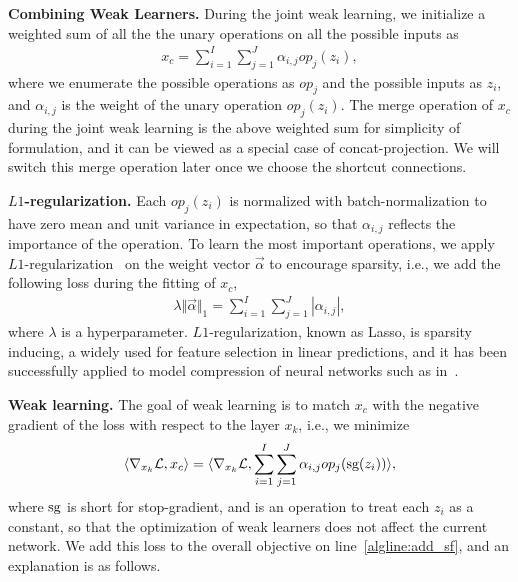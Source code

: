 \textbf{Combining Weak Learners.} During the joint weak learning, we initialize a weighted sum of all the the unary operations on all the possible inputs as
\begin{align}
    x_c = \sum _{i=1}^I \sum_{j=1}^J \alpha_{i,j} op_j(z_i),
    \label{eq:x_c_select}
\end{align}
where we enumerate the possible operations as $op_j$ and the possible inputs as $z_i$, and $\alpha_{i,j}$ is the weight of the unary operation $op_j(z_i)$.  
The merge operation of $x_c$ during the joint weak learning is the above weighted sum for simplicity of formulation, and it can be viewed as a special case
of concat-projection. We will switch this merge operation later once we choose the shortcut connections. 


\textbf{$L1$-regularization.} Each $op_j(z_i)$ is normalized with batch-normalization to have zero mean and unit variance in expectation, so that $\alpha_{i,j}$ reflects 
the importance of the operation.
To learn the most important operations, we apply $L1$-regularization~\citep{lasso} on the weight vector $\vec{\alpha}$ to encourage sparsity, i.e.,
we add the following loss during the fitting of $x_c$,  
\begin{align}
    \lambda \Vert \vec{\alpha} \Vert_1 = \sum_{i=1}^I \sum _{j=1}^J | \alpha _{i,j} |,
    \label{eq:x_c_select_loss}
\end{align} 
where $\lambda$ is a hyperparameter. $L1$-regularization, known as Lasso, is sparsity inducing, a widely used for feature selection in 
linear predictions, and it has been successfully applied to model compression of neural networks such as in~\citep{huang2017condensenet}.


\textbf{Weak learning.} 
The goal of weak learning is to match $x_c$ with the negative gradient of the loss with respect to the layer $x_{k}$, i.e., 
we minimize 
\begin{align}
   \langle \nabla_{x_{k}} \mathcal{L}, x_c \rangle =  
   \langle \nabla_{x_{k}} \mathcal{L}, \sum _{i=1}^I \sum_{j=1}^J \alpha_{i,j} op_j( \textrm{sg}( z_i ) ) \rangle,
    \label{eq:x_c_linear_loss}
\end{align}
where $\textrm{sg}$ is short for stop-gradient, and is an operation to treat each $z_i$ as a constant, so that the optimization of weak learners does not 
affect the current network. We add this loss to the overall objective on line~\ref{algline:add_sf}, and an explanation is as follows.

